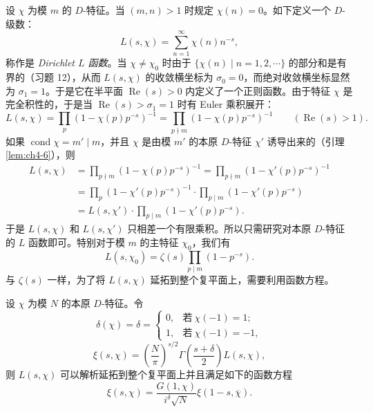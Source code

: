 设 $\chi$ 为模 $m$ 的 $D$-特征。当 $(m,n)>1$ 时规定 $\chi(n)=0$。如下定义一个 $D$-级数：
\[
  L(s,\chi)=\sum_{n=1}^{\infty}\chi(n)n^{-s},
\]
称作是 \emph{Dirichlet $L$ 函数}。当 $\chi\neq\chi_0$ 时由于 $\{\chi(n)\mid n=1,2,\cdots\}$ 的部分和是有界的（习题 12），从而 $L(s,\chi)$ 的收敛横坐标为 $\sigma_0=0$，而绝对收敛横坐标显然为 $\sigma_1=1$。于是它在半平面 $\operatorname{Re}(s)>0$ 内定义了一个正则函数。由于特征 $\chi$ 是完全积性的，于是当 $\operatorname{Re}(s)>\sigma_1=1$ 时有 Euler 乘积展开：
\[
  L(s,\chi)=\prod_p(1-\chi(p)p^{-s})^{-1}
  =\prod_{p\nmid m}(1-\chi(p)p^{-s})^{-1}\qquad(\operatorname{Re}(s)>1).
\]
如果 $\operatorname{cond}\chi=m'\mid m$，并且 $\chi$ 是由模 $m'$ 的本原 $D$-特征 $\chi'$ 诱导出来的（引理 \ref{lem:ch4-6}），则
\begin{align*}
  L(s,\chi)&=\prod_{p\nmid m}(1-\chi(p)p^{-s})^{-1}=\prod_{p\nmid m}(1-\chi'(p)p^{-s})^{-1}\\
  &=\prod_p(1-\chi'(p)p^{-s})^{-1}\cdot\prod_{p\mid m}(1-\chi'(p)p^{-s})\\
  &=L(s,\chi')\cdot\prod_{p\mid m}(1-\chi'(p)p^{-s}).
\end{align*}
于是 $L(s,\chi)$ 和 $L(s,\chi')$ 只相差一个有限乘积。所以只需研究对本原 $D$-特征的 $L$ 函数即可。特别对于模 $m$ 的主特征 $\chi_0$，我们有
\[
  L(s,\chi_0)=\zeta(s)\prod_{p\mid m}(1-p^{-s}).
\]
与 $\zeta(s)$ 一样，为了将 $L(s,\chi)$ 延拓到整个复平面上，需要利用函数方程。

\begin{theorem}\label{thm:4.8}
设 $\chi$ 为模 $N$ 的本原 $D$-特征。令
\[
  \delta(\chi)=\delta=\begin{cases}
    0, & \text{若}\ \chi(-1)=1;\\
    1, & \text{若}\ \chi(-1)=-1,
  \end{cases}
\]
\[
  \xi(s,\chi)=\left(\frac{N}{\pi}\right)^{s/2}\Gamma\left(\frac{s+\delta}{2}\right)L(s,\chi),
\]
则 $L(s,\chi)$ 可以解析延拓到整个复平面上并且满足如下的函数方程
\[
  \xi(s,\chi)=\frac{G(1,\chi)}{i^{\delta}\sqrt{N}}\xi(1-s,\overline{\chi}).
\]
\end{theorem}

